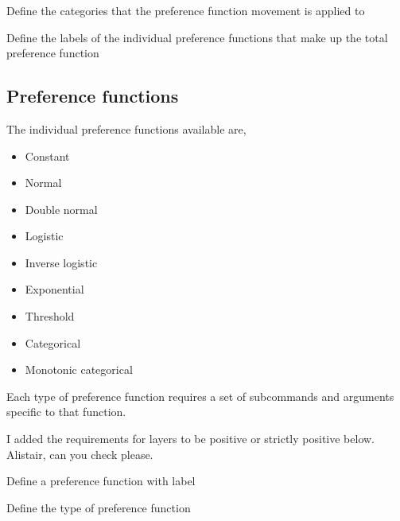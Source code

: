 \subsubsection[Preference movement]{}

 {Define the categories that the preference function movement is applied to}

 {Define the labels of the individual  preference functions that make up the total preference function}

\subsection{Preference functions}

The individual preference functions available are,

\begin{itemize}
	\item Constant
	\item Normal
	\item Double normal
	\item Logistic
	\item Inverse logistic
	\item Exponential
	\item Threshold
	\item Categorical
	\item Monotonic categorical
\end{itemize}

Each type of preference function requires a set of subcommands and arguments specific to that function.

\TODO

I added the requirements for layers to be positive or strictly positive below. Alistair, can you check please.

\TODOend

 {Define a preference function with label}

 {Define the type of preference function}

\subsubsection[Constant]{}

